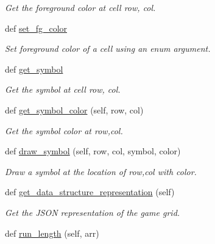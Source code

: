 \begin{DoxyCompactItemize}
\begin{DoxyCompactList}\small\item\em Get the foreground color at cell row, col. \end{DoxyCompactList}\item 
def \mbox{\hyperlink{classbridges_1_1game__grid_1_1_game_grid_a9f9040a6b8b88d7d7c74194c22890047}{set\+\_\+fg\+\_\+color}}
\begin{DoxyCompactList}\small\item\em Set foreground color of a cell using an enum argument. \end{DoxyCompactList}\item 
def \mbox{\hyperlink{classbridges_1_1game__grid_1_1_game_grid_a03818f51e8f99ae68eb7dc6a7f74a4e7}{get\+\_\+symbol}}
\begin{DoxyCompactList}\small\item\em Get the symbol at cell row, col. \end{DoxyCompactList}\item 
def \mbox{\hyperlink{classbridges_1_1game__grid_1_1_game_grid_a7324c15bc6983621ed84964dde173f7f}{get\+\_\+symbol\+\_\+color}} (self, row, col)
\begin{DoxyCompactList}\small\item\em Get the symbol color at row,col. \end{DoxyCompactList}\item 
def \mbox{\hyperlink{classbridges_1_1game__grid_1_1_game_grid_aa7ce48d090d75c8022a8356aafad303f}{draw\+\_\+symbol}} (self, row, col, symbol, color)
\begin{DoxyCompactList}\small\item\em Draw a symbol at the location of row,col with color. \end{DoxyCompactList}\item 
def \mbox{\hyperlink{classbridges_1_1game__grid_1_1_game_grid_acb17afe074d5222b418e922ed5f48ed7}{get\+\_\+data\+\_\+structure\+\_\+representation}} (self)
\begin{DoxyCompactList}\small\item\em Get the J\+S\+ON representation of the game grid. \end{DoxyCompactList}\item 
def \mbox{\hyperlink{classbridges_1_1game__grid_1_1_game_grid_a80f0ce020baf3d5fe53cbd719fbe78e5}{run\+\_\+length}} (self, arr)
\end{DoxyCompactItemize}
